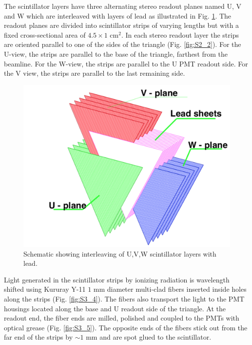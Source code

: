The scintillator layers have three alternating stereo readout planes named U, V and W which are interleaved with layers of lead as illustrated in Fig. \ref{fig:S3_2}. The readout planes are divided into scintillator strips of varying lengths but with a fixed cross-sectional area of $4.5 \times 1$ cm$^2$. In each stereo readout layer the strips are oriented parallel to one of the sides of the triangle (Fig. \ref{fig:S2_2}). For the U-view, the strips are parallel to the base of the triangle, farthest from the beamline. For the W-view, the strips are parallel to the U PMT readout side.  For the V view, the strips are parallel to the last remaining side.  

\begin{figure}[hbt]
\centering
\includegraphics[width=0.95\columnwidth,keepaspectratio]{img/S3_2.png}
\caption[PCAL UVW Layers]{Schematic showing interleaving of U,V,W scintillator layers with lead. }
\label{fig:S3_2}
\end{figure}

Light generated in the scintillator strips by ionizing radiation is wavelength shifted using Kururay Y-11 $1$ mm diameter multi-clad fibers inserted inside holes along the strips (Fig. \ref{fig:S3_4}). The fibers also transport the light to the PMT housings located along the base and U readout side of the triangle. At the readout end, the fiber ends are milled, polished and coupled to the PMTs with optical grease (Fig. \ref{fig:S3_5}). The opposite ends of the fibers stick out from the far end of the strips by $\sim 1$ mm and are spot glued to the scintillator.

